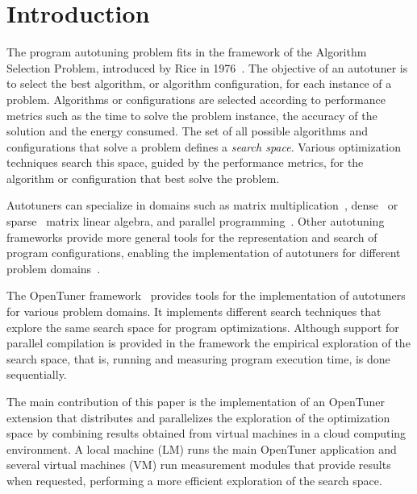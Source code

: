 \documentclass[a4paper, 12pt]{article}
\begin{document}
\section{Introduction} \label{sec:intro}


The program autotuning problem fits in the framework of the Algorithm Selection
Problem, introduced by Rice in 1976~\cite{rice1976algorithm}. The objective of
an autotuner is to select the best algorithm, or algorithm configuration, for
each instance of a problem.  Algorithms or configurations are selected
according to performance metrics such as the time to solve the problem
instance, the accuracy of the solution and the energy consumed.  The set of all
possible algorithms and configurations that solve a problem defines a
\emph{search space}. Various optimization techniques search this space, guided
by the performance metrics, for the algorithm or configuration that best solve
the problem.

Autotuners can specialize in domains such as matrix
multiplication~\cite{bilmes1997phipac}, dense~\cite{whaley1998atlas} or
sparse~\cite{vuduc2005oski} matrix linear algebra, and parallel
programming~\cite{jordan2012multi}. Other autotuning frameworks provide more
general tools for the representation and search of program configurations,
enabling the implementation of autotuners for different problem
domains~\cite{ansel2014opentuner,hutter2009paramils}.

The OpenTuner framework~\cite{ansel2014opentuner} provides tools for the
implementation of autotuners for various problem domains. It implements
different search techniques that explore the same search space for program
optimizations. Although support for parallel compilation is provided in the
framework the empirical exploration of the search space, that is, running and
measuring program execution time, is done sequentially.

The main contribution of this paper is the implementation of an
OpenTuner extension that distributes and parallelizes the exploration of
the optimization space by combining results obtained from virtual machines
in a cloud computing environment. A local machine (LM) runs the main
OpenTuner application and several virtual machines (VM) run measurement
modules that provide results when requested, performing a more efficient
exploration of the search space.
\end{document}
